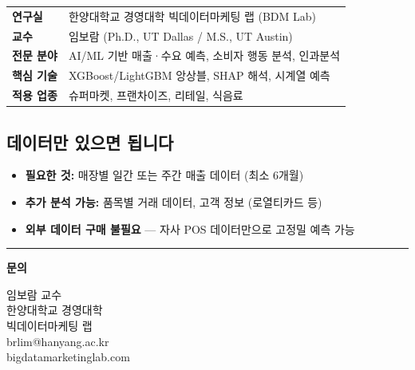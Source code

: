 \documentclass[11pt, a4paper]{article}
\begin{document}
\begin{table}[H]
\centering
\renewcommand{\arraystretch}{1.3}
\begin{tabularx}{\textwidth}{L{4cm} X}
\toprule
{} & \\
\midrule
\textbf{연구실} & 한양대학교 경영대학 빅데이터마케팅 랩 (BDM Lab) \\[4pt]
\textbf{교수} & 임보람 (Ph.D., UT Dallas / M.S., UT Austin) \\[4pt]
\textbf{전문 분야} & AI/ML 기반 매출·수요 예측, 소비자 행동 분석, 인과분석 \\[4pt]
\textbf{핵심 기술} & XGBoost/LightGBM 앙상블, SHAP 해석, 시계열 예측 \\[4pt]
\textbf{적용 업종} & 슈퍼마켓, 프랜차이즈, 리테일, 식음료 \\
\bottomrule
\end{tabularx}
\end{table}

\subsection{데이터만 있으면 됩니다}

\begin{itemize}[itemsep=6pt, leftmargin=2em]
  \item \textbf{필요한 것:} 매장별 일간 또는 주간 매출 데이터 (최소 6개월)
  \item \textbf{추가 분석 가능:} 품목별 거래 데이터, 고객 정보 (로열티카드 등)
  \item \textbf{외부 데이터 구매 불필요} — 자사 POS 데이터만으로 고정밀 예측 가능
\end{itemize}

\vspace{1.5cm}

\begin{center}
\textcolor{medblue}{\rule{8cm}{0.8pt}}

\vspace{1cm}

{\Large\bfseries\color{darkblue} 문의}

\vspace{0.5cm}

{\large\color{darkgray}
임보람 교수\\[4pt]
한양대학교 경영대학\\[4pt]
빅데이터마케팅 랩\\[8pt]
brlim@hanyang.ac.kr\\[4pt]
bigdatamarketinglab.com}
\end{center}
\end{document}

